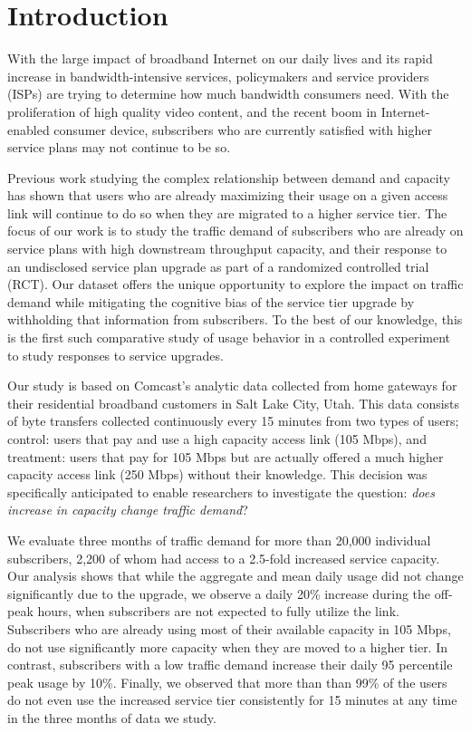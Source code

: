 \section{Introduction}\label{sec:introduction}

With the large impact of broadband Internet on our daily lives and 
its rapid increase in bandwidth-intensive services, policymakers and 
service providers (ISPs) are trying to determine how much bandwidth 
consumers need. With the proliferation of high 
quality video content, and the recent boom in Internet-enabled consumer 
device, subscribers who are currently satisfied with higher service plans 
may not continue to be so. 

Previous work studying the complex relationship between demand and capacity has 
shown that users who are already maximizing their usage on a given access link 
will continue to do so when they are migrated to a higher service tier. The 
focus of our work is to study the traffic demand of subscribers who are already 
on service plans with high downstream throughput capacity, and their response to 
an undisclosed service plan upgrade as part of a randomized controlled trial 
(RCT). Our dataset offers the unique opportunity to explore the impact on 
traffic demand while mitigating the cognitive bias of the service tier upgrade 
by withholding that information from subscribers. To the best of our knowledge, 
this is the first such comparative study of usage behavior in a controlled 
experiment to study responses to service upgrades.

Our study is based on Comcast's analytic data collected from home gateways for 
their residential broadband customers in Salt Lake City, Utah. This data 
consists of byte transfers collected continuously every 15 minutes from two 
types of users; control: users that pay and use a high capacity access link (105 
Mbps), and treatment: users that pay for 105 Mbps but are actually offered a 
much higher capacity access link (250 Mbps) without their knowledge. This 
decision was specifically anticipated to enable researchers to investigate the 
question: \emph{does increase in capacity change traffic demand}?

We evaluate three months of traffic demand for more than 20,000 
individual subscribers, 2,200 of whom had access to a 2.5-fold increased 
service capacity. Our analysis shows that while the aggregate and mean daily 
usage did not change significantly due to the upgrade, we observe a daily 20\% 
increase during the off-peak hours, when subscribers are not expected to fully 
utilize the link. Subscribers who are already using most of their 
available capacity in 105 Mbps, do not use significantly more capacity when
they are moved to a higher tier. In contrast, subscribers with a low traffic demand 
increase their daily 95 percentile peak usage by 10\%. Finally, we observed 
that more than than 99\% of the users do not even use the increased service 
tier consistently for 15 minutes at any time in the three months of data we 
study.

